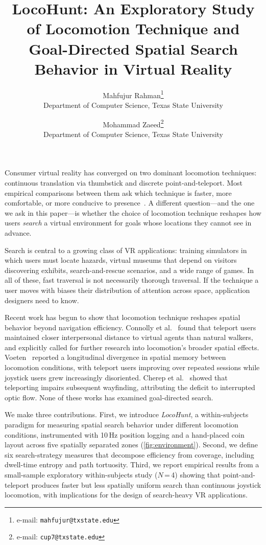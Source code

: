 \documentclass{vgtc}
\title{LocoHunt: An Exploratory Study of Locomotion Technique and Goal-Directed Spatial Search Behavior in Virtual Reality}
\author{Mahfujur Rahman\thanks{e-mail: \texttt{mahfujur@txstate.edu}}\\ %
        \scriptsize Department of Computer Science, Texas State University %
\and Mohammad Zaeed\thanks{e-mail: \texttt{cup7@txstate.edu}}\\ %
        \scriptsize Department of Computer Science, Texas State University}
\begin{document}
\maketitle

Consumer virtual reality has converged on two dominant locomotion techniques: continuous translation via thumbstick and discrete point-and-teleport. Most empirical comparisons between them ask which technique is faster, more comfortable, or more conducive to presence~\cite{Bozgeyikli:2016:PTL,Coomer:2018:EFL}. A different question---and the one we ask in this paper---is whether the choice of locomotion technique reshapes how users \emph{search} a virtual environment for goals whose locations they cannot see in advance.

Search is central to a growing class of VR applications: training simulators in which users must locate hazards, virtual museums that depend on visitors discovering exhibits, search-and-rescue scenarios, and a wide range of games. In all of these, fast traversal is not necessarily thorough traversal. If the technique a user moves with biases their distribution of attention across space, application designers need to know.

Recent work has begun to show that locomotion technique reshapes spatial behavior beyond navigation efficiency. Connolly et al.~\cite{Connolly:2025:LIV} found that teleport users maintained closer interpersonal distance to virtual agents than natural walkers, and explicitly called for further research into locomotion's broader spatial effects. Voeten~\cite{Voeten:2023:LMS} reported a longitudinal divergence in spatial memory between locomotion conditions, with teleport users improving over repeated sessions while joystick users grew increasingly disoriented. Cherep et al.~\cite{Cherep:2020:STV} showed that teleporting impairs subsequent wayfinding, attributing the deficit to interrupted optic flow. None of these works has examined goal-directed search.

We make three contributions. First, we introduce \emph{LocoHunt}, a within-subjects paradigm for measuring spatial search behavior under different locomotion conditions, instrumented with 10\,Hz position logging and a hand-placed coin layout across five spatially separated zones (\autoref{fig:environment}). Second, we define six search-strategy measures that decompose efficiency from coverage, including dwell-time entropy and path tortuosity. Third, we report empirical results from a small-sample exploratory within-subjects study ($N$\,=\,4) showing that point-and-teleport produces faster but less spatially uniform search than continuous joystick locomotion, with implications for the design of search-heavy VR applications.
\end{document}
